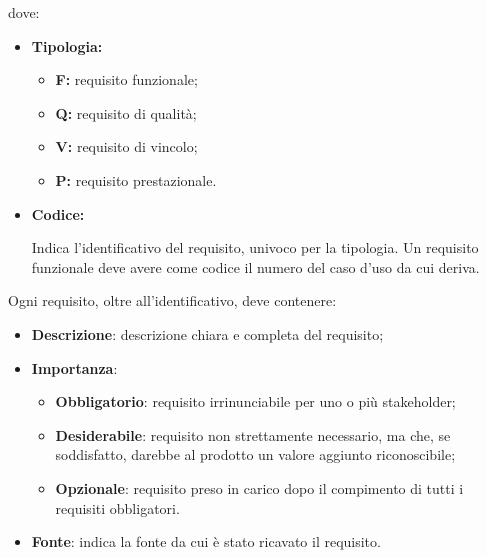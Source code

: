 dove:
\begin{itemize}
    \item \textbf{Tipologia:}
          \begin{itemize}
              \item \textbf{F:} requisito funzionale;
              \item \textbf{Q:} requisito di qualità;
              \item \textbf{V:} requisito di vincolo;
              \item \textbf{P:} requisito prestazionale.
          \end{itemize}
    \item \textbf{Codice:}
          \par Indica l'identificativo del requisito, univoco per la tipologia. Un
          requisito funzionale deve avere come codice il numero del caso d'uso da cui
          deriva.
\end{itemize}
Ogni requisito, oltre all'identificativo, deve contenere:
\begin{itemize}
    \item \textbf{Descrizione}: descrizione chiara e completa del requisito;
    \item \textbf{Importanza}:
          \begin{itemize}
              \item \textbf{Obbligatorio}: requisito irrinunciabile per uno o più stakeholder;
              \item \textbf{Desiderabile}: requisito non strettamente necessario, ma che, se soddisfatto, darebbe al prodotto un valore aggiunto riconoscibile;
              \item \textbf{Opzionale}: requisito preso in carico dopo il compimento di tutti i requisiti obbligatori.
          \end{itemize}
    \item \textbf{Fonte}: indica la fonte da cui è stato ricavato il requisito.
\end{itemize}
